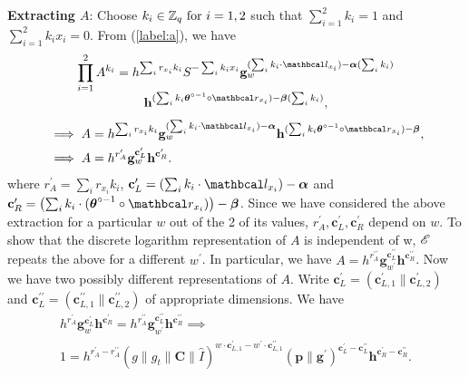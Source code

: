   \textbf{Extracting $A$}: Choose $k_i \in \mathbb{Z}_q \text{ for } i=1,2$ such that $\sum_{i=1}^{2} k_i =1$ and $\sum_{i=1}^{2} k_ix_i =0$. From (\ref{label:a}), we have
  \begin{multline*}
      \prod_{i=1}^{2} A^{k_i} = h^{\sum_{i} r_{x_i}k_i} S^{-\sum_{i} k_i x_i}  
      \textbf{g}_w^{ (\sum_{i} k_i \cdot \lvec_{x_i}) - \vecnb{\alpha}(\sum_{i} k_i)}  \\[-4pt]
      \textbf{h}^{(\sum_{i} k_i \vecnb{\theta}^{\circ -1} \circ \rvec_{x_i}) - \vecnb{\beta}(\sum_{i} k_i)},
  \end{multline*}
  \begin{align*}
      & \implies A = h^{\sum_{i} r_{x_i}k_i} 
      \textbf{g}_w^{(\sum_{i} k_i \cdot \lvec_{x_i}) - \vecnb{\alpha}}
      \textbf{h}^{(\sum_{i} k_i \vecnb{\theta}^{\circ -1} \circ \rvec_{x_i}) - \vecnb{\beta}},\\
      & \implies A = h^{r_A^{\prime}} \textbf{g}_w^{\textbf{c}_L^{\prime}} \textbf{h}^{\textbf{c}_R^{\prime}}.
  \end{align*}
  where $r_A^{\prime} = \sum_{i} r_{x_i}k_i$, $\textbf{c}_L^{\prime} = \left( \sum_{i}  k_i \cdot \lvec_{x_i} \right) - \vecnb{\alpha}$ and $\textbf{c}_R^{\prime} = \left(\sum_{i} k_i \cdot (\vecnb{\theta}^{\circ -1} \circ \rvec_{x_i}) \right) - \vecnb{\beta}$.
  Since we have considered the above extraction for a particular $w$ out of the 2 of its values, $r_A^{\prime}, \textbf{c}_L^{\prime}, \textbf{c}_R^{\prime}$ depend on $w$. 
  To show that the discrete logarithm representation of $A$ is independent of w, $\mathscr{E}$ repeats the above for a different $w^{\prime}$. In particular, we have $A= h^{r_A^{\prime \prime}} \textbf{g}_{w^{\prime}}^{\textbf{c}_L^{\prime \prime}} \textbf{h}^{\textbf{c}_R^{\prime \prime}}$. 
  Now we have two possibly different representations of $A$. Write $\textbf{c}_L^{\prime} = (\textbf{c}_{L,1}^{\prime} \| \textbf{c}_{L,2}^{\prime})$  and $\textbf{c}_L^{\prime \prime} = (\textbf{c}_{L,1}^{\prime \prime} \| \textbf{c}_{L,2}^{\prime \prime})$ of appropriate dimensions. We have
  \begin{gather*}
      h^{r_A^{\prime}} \textbf{g}_w^{\textbf{c}_L^{\prime}} \textbf{h}^{\textbf{c}_R^{\prime}} =
      h^{r_A^{\prime \prime}} \textbf{g}_{w^{\prime}}^{\textbf{c}_L^{\prime \prime}} \textbf{h}^{\textbf{c}_R^{\prime \prime}} \implies \\
      1 = h^{r_A^{\prime} - r_A^{\prime \prime}} 
      (g \| g_t \| \textbf{C} \| \hat{I})^{w \cdot \textbf{c}_{L,1}^{\prime} - w^{\prime} \cdot \textbf{c}_{L,1}^{\prime \prime}} 
      (\textbf{p}\|\textbf{g}^{\prime})^{\textbf{c}_{L}^{\prime} - \textbf{c}_{L}^{\prime \prime}}
      \textbf{h}^{\textbf{c}_{R}^{\prime} - \textbf{c}_{R}^{\prime \prime}}.
  \end{gather*}
  
